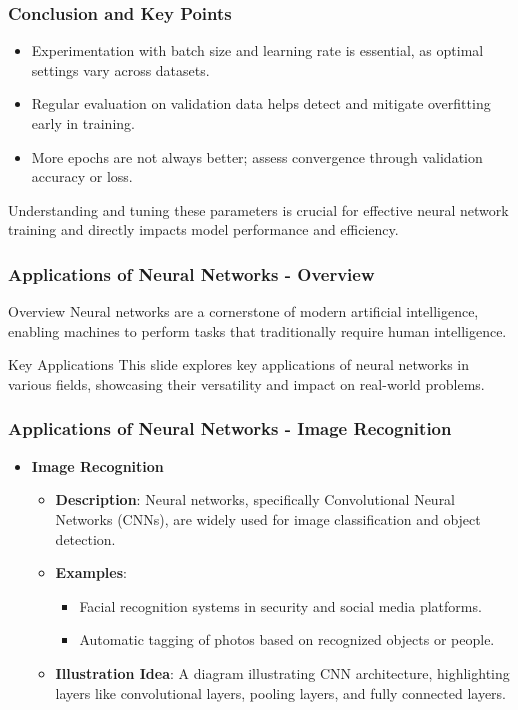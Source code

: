 \documentclass[aspectratio=169]{beamer}
\begin{document}
\begin{frame}[fragile]
    \frametitle{Conclusion and Key Points}

    \begin{itemize}
        \item Experimentation with batch size and learning rate is essential, as optimal settings vary across datasets.
        \item Regular evaluation on validation data helps detect and mitigate overfitting early in training.
        \item More epochs are not always better; assess convergence through validation accuracy or loss.
    \end{itemize}

    Understanding and tuning these parameters is crucial for effective neural network training and directly impacts model performance and efficiency.
\end{frame}

\begin{frame}[fragile]
    \frametitle{Applications of Neural Networks - Overview}
    \begin{block}{Overview}
        Neural networks are a cornerstone of modern artificial intelligence, enabling machines to perform tasks that traditionally require human intelligence. 
    \end{block}
    \begin{block}{Key Applications}
        This slide explores key applications of neural networks in various fields, showcasing their versatility and impact on real-world problems.
    \end{block}
\end{frame}

\begin{frame}[fragile]
    \frametitle{Applications of Neural Networks - Image Recognition}
    \begin{itemize}
        \item \textbf{Image Recognition}
            \begin{itemize}
                \item \textbf{Description}: Neural networks, specifically Convolutional Neural Networks (CNNs), are widely used for image classification and object detection.
                \item \textbf{Examples}:
                    \begin{itemize}
                        \item Facial recognition systems in security and social media platforms.
                        \item Automatic tagging of photos based on recognized objects or people.
                    \end{itemize}
                \item \textbf{Illustration Idea}: A diagram illustrating CNN architecture, highlighting layers like convolutional layers, pooling layers, and fully connected layers.
            \end{itemize}
    \end{itemize}
\end{frame}
\end{document}
